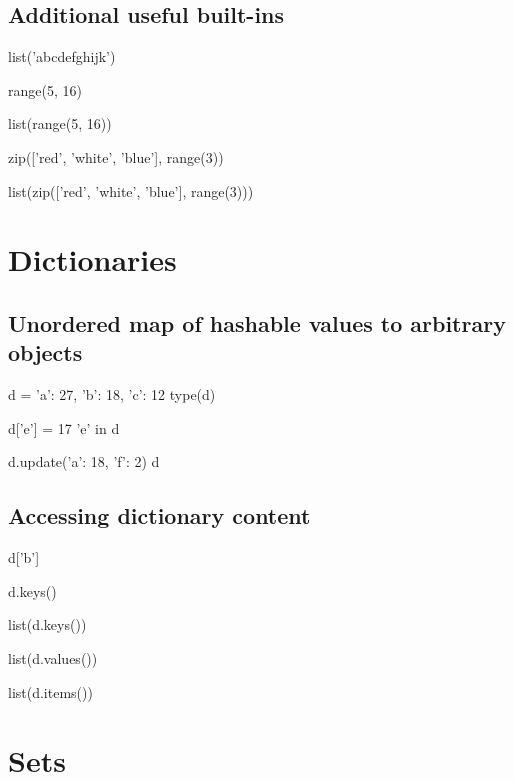 \documentclass[aspectratio=1610,slidestop]{beamer}
\begin{document}
\subsection{Additional useful built-ins}
\begin{pframe}
\vspace{-0.25cm}
\begin{pyconsole}
list('abcdefghijk')

range(5, 16)

list(range(5, 16))

zip(['red', 'white', 'blue'], range(3))

list(zip(['red', 'white', 'blue'], range(3)))
\end{pyconsole}
\end{pframe}


\section{Dictionaries}
\subsection{Unordered map of hashable values to arbitrary objects}
\begin{pframe}
\begin{pyconsole}
d = {'a': 27, 'b': 18, 'c': 12}
type(d)

d['e'] = 17
'e' in d

d.update({'a': 18, 'f': 2})
d
\end{pyconsole}
\end{pframe}


\subsection{Accessing dictionary content}
\begin{pframe}
\vspace{-0.25cm}
\begin{pyconsole}
d['b']

d.keys()

list(d.keys())

list(d.values())

list(d.items())
\end{pyconsole}
\end{pframe}


\section{Sets}
\end{document}
